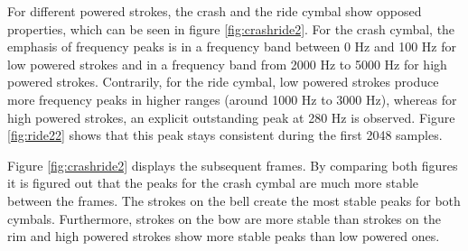 For different powered strokes, the crash and the ride cymbal show opposed properties, which can be seen in figure \ref{fig:crashride2}. For the crash cymbal, the emphasis of frequency peaks is in a frequency band between 0 Hz and 100 Hz for low powered strokes and in a frequency band from 2000 Hz to 5000 Hz for high powered strokes. Contrarily, for the ride cymbal, low powered strokes produce more frequency peaks in higher ranges (around 1000 Hz to 3000 Hz), whereas for high powered strokes, an explicit outstanding peak at 280 Hz is observed. Figure \ref{fig:ride22} shows that this peak stays consistent during the first 2048 samples.

Figure \ref{fig:crashride2} displays the subsequent frames. By comparing both figures it is figured out that the peaks for the crash cymbal are much more stable between the frames. The strokes on the bell create the most stable peaks for both cymbals. Furthermore, strokes on the bow are more stable than strokes on the rim and high powered strokes show more stable peaks than low powered ones.

